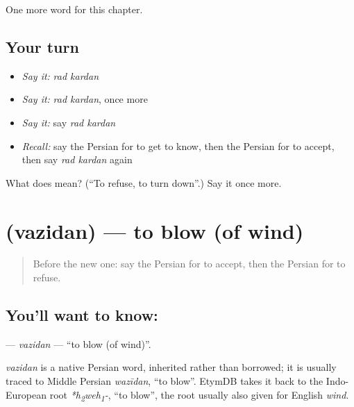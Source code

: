 \begin{grammarlens}[title={What you've built}]
One more word for this chapter.
\end{grammarlens}

\subsection*{Your turn}
\begin{itemize}
\raggedright
  \item \emph{Say it:} \emph{rad kardan}
  \item \emph{Say it:} \emph{rad kardan}, once more
  \item \emph{Say it:} say \emph{rad kardan}
  \item \emph{Recall:} say the Persian for to get to know, then the Persian for to accept, then say \emph{rad kardan} again
\end{itemize}

\begin{tcolorbox}[breakable,colback=teal!4,colframe=teal!35!black,title={Before you move on}]
What does   mean? (\textquotedblleft{}To refuse, to turn down\textquotedblright{}.) Say it once more.
\end{tcolorbox}
\section[\texorpdfstring{\fa{وزیدن} (vazidan)}{وزیدن (vazidan)}]{ (vazidan) — to blow (of wind)}

\label{lesson:FA-C184-vazidan}



\begin{quote}
Before the new one: say the Persian for to accept, then the Persian for to refuse.
\end{quote}

\subsection*{You'll want to know: }
\textbf{} — \emph{vazidan} — \textquotedblleft{}to blow (of wind)\textquotedblright{}.

\begin{cousinweb}
\emph{vazidan} is a native Persian word, inherited rather than borrowed; it is usually traced to Middle Persian \emph{wazīdan}, \textquotedblleft{}to blow\textquotedblright{}. EtymDB takes it back to the Indo-European root \emph{*h\textsubscript{2}weh\textsubscript{1}-}, \textquotedblleft{}to blow\textquotedblright{}, the root usually also given for English \emph{wind}.
\end{cousinweb}

